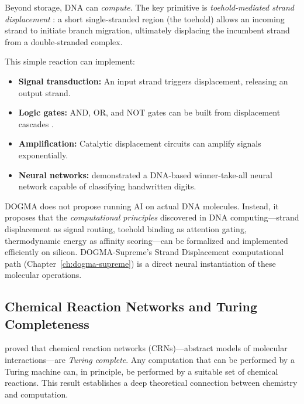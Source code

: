 Beyond storage, DNA can \emph{compute}. The key primitive is \emph{toehold-mediated strand displacement} \citep{zhang2011}: a short single-stranded region (the toehold) allows an incoming strand to initiate branch migration, ultimately displacing the incumbent strand from a double-stranded complex.

This simple reaction can implement:
\begin{itemize}[leftmargin=1.8em]
  \item \textbf{Signal transduction:} An input strand triggers displacement, releasing an output strand.
  \item \textbf{Logic gates:} AND, OR, and NOT gates can be built from displacement cascades \citep{seelig2006}.
  \item \textbf{Amplification:} Catalytic displacement circuits can amplify signals exponentially.
  \item \textbf{Neural networks:} \citet{cherry2018} demonstrated a DNA-based winner-take-all neural network capable of classifying handwritten digits.
\end{itemize}

\begin{keyinsight}
DOGMA does not propose running AI on actual DNA molecules. Instead, it proposes that the \emph{computational principles} discovered in DNA computing---strand displacement as signal routing, toehold binding as attention gating, thermodynamic energy as affinity scoring---can be formalized and implemented efficiently on silicon. DOGMA-Supreme's Strand Displacement computational path (Chapter~\ref{ch:dogma-supreme}) is a direct neural instantiation of these molecular operations.
\end{keyinsight}

\subsection{Chemical Reaction Networks and Turing Completeness}

\citet{soloveichik2010} proved that chemical reaction networks (CRNs)---abstract models of molecular interactions---are \emph{Turing complete}. Any computation that can be performed by a Turing machine can, in principle, be performed by a suitable set of chemical reactions. This result establishes a deep theoretical connection between chemistry and computation.

